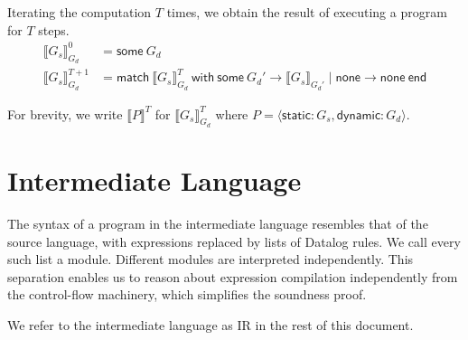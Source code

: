 \documentclass[11pt]{article}
\newcommand{\none}{\textsf{none}}
\newcommand{\some}[1]{\textsf{some}~#1}
\newcommand{\matchwith}[2]{\textsf{match}~#1~\textsf{with}~#2~\textsf{end}}
\newcommand{\static}{\textsf{static}}
\newcommand{\dynamic}{\textsf{dynamic}}
\begin{document}
Iterating the computation $T$ times, we obtain the result of executing a program for $T$ steps.
\[
\begin{aligned}
\llbracket G_s \rrbracket_{G_d}^0 &= \some{G_d}\\
\llbracket G_s \rrbracket_{G_d}^{T+1} &=
\matchwith{\llbracket G_s \rrbracket_{G_d}^T}
{\some{G_d'} \rightarrow \llbracket G_s \rrbracket_{G_d'}
\mid \none{} \rightarrow \none{}}
\end{aligned}
\]

For brevity, we write $\llbracket P \rrbracket^T$ for $\llbracket G_s \rrbracket_{G_d}^T$ where $P = \langle \static{}: G_s, \dynamic{}: G_d \rangle$.

\section{Intermediate Language}
The syntax of a program in the intermediate language resembles that of the source language, with expressions replaced by lists of Datalog rules.
We call every such list a module.
Different modules are interpreted independently.
This separation enables us to reason about expression compilation independently from the control-flow machinery, which simplifies the soundness proof.

We refer to the intermediate language as IR in the rest of this document.
\end{document}
